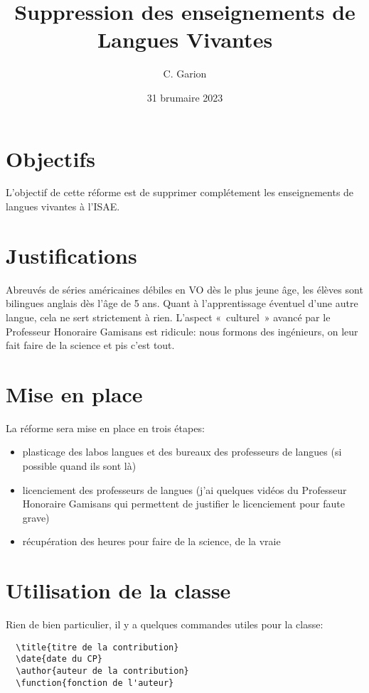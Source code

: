 \documentclass[french]{supaero-note-cf}
\begin{document}
\title{Suppression des enseignements de Langues Vivantes}
\author{C. Garion}
\date{31 brumaire 2023}

\section{Objectifs}
\label{sec:objectifs}

L'objectif de cette réforme est de supprimer complétement les
enseignements de langues vivantes à l'ISAE.

\section{Justifications}
\label{sec:justifications}

Abreuvés de séries américaines débiles en VO dès le plus jeune âge,
les élèves sont bilingues anglais dès l'âge de 5 ans. Quant à
l'apprentissage éventuel d'une autre langue, cela ne sert strictement
à rien. L'aspect «~culturel~» avancé par le Professeur Honoraire
Gamisans est ridicule: nous formons des ingénieurs, on leur fait faire
de la science et pis c'est tout.

\section{Mise en place}
\label{sec:mise-en-place}

La réforme sera mise en place en trois étapes:

\begin{itemize}
\item plasticage des labos langues et des bureaux des professeurs de
  langues (si possible quand ils sont là)
\item licenciement des professeurs de langues (j'ai quelques vidéos du
  Professeur Honoraire Gamisans qui permettent de justifier le
  licenciement pour faute grave)
\item récupération des heures pour faire de la science, de la vraie
\end{itemize}

\section{Utilisation de la classe}
\label{sec:utilisation-de-la}

Rien de bien particulier, il y a quelques commandes utiles pour la
classe:

\begin{verbatim}
  \title{titre de la contribution}
  \date{date du CP}
  \author{auteur de la contribution}
  \function{fonction de l'auteur}
\end{verbatim}
\end{document}
